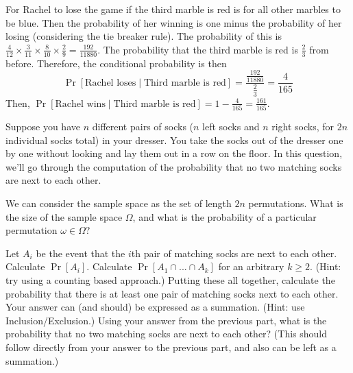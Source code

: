 \documentclass[11pt]{article}
\begin{document}
\begin{solution}
\begin{Parts}
\Part For Rachel to lose the game if the third marble is red is for all other
marbles to be blue. Then the probability of her winning is one minus the probability
of her losing (considering the tie breaker rule). The probability of this is $\frac{4}{12} 
\times \frac{3}{11} \times \frac{8}{10} \times \frac{2}{9} = \frac{192}{11880}$. 
The probability that the third marble is red is $\frac{2}{3}$ from before. 
Therefore, the conditional probability is then
\[
    \Pr[\text{Rachel loses} \mid \text{Third marble is red}] = \frac{\frac{192}{11880}}
    {\frac{2}{3}} = \frac{4}{165}
\]
Then, $\Pr[\text{Rachel wins} \mid \text{Third marble is red}] = 1 - \frac{4}{165} = 
\frac{161}{165}$.

\end{Parts}

\end{solution}

Suppose you have $n$ different pairs of socks ($n$ left socks and $n$ right socks, for $2n$ individual socks total) in your dresser. 
You take the socks out of the dresser one by one without looking and lay them out in a row on the floor. 
In this question, we'll go through the computation of the probability that no two matching socks are next to each other.

\begin{Parts}
    \Part We can consider the sample space as the set of length $2n$ permutations. What is the size of the sample space $\Omega$, and what is the probability of a particular permutation $\omega \in \Omega$?

    \Part Let $A_i$ be the event that the $i$th pair of matching socks are next to each other. Calculate $\Pr[A_i]$.
    \Part Calculate $\Pr[A_1 \cap  ... \cap A_k]$ for an arbitrary $k \geq 2$. (Hint: try using a counting based approach.)
    \Part Putting these all together, calculate the probability that there is at least one pair of matching socks next to each other. Your answer can (and should) be expressed as a summation. (Hint: use Inclusion/Exclusion.)
    \Part Using your answer from the previous part, what is the probability that no two matching socks are next to each other? (This should follow directly from your answer to the previous part, and also can be left as a summation.)
\end{Parts}
\end{document}
